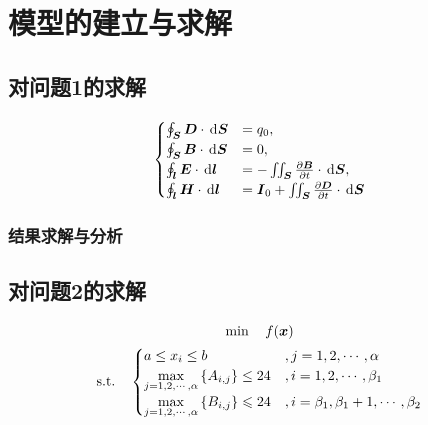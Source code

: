 
\section{模型的建立与求解}


\subsection{对问题1的求解}

\zhlipsum[1]

\begin{equation}\label{equ:麦克斯韦方程组}
\begin{cases}
\oint_{\boldsymbol{S}}\boldsymbol{D}\cdot\operatorname{\,\mathrm{d}\hspace{-1.5pt}}\boldsymbol{S} &= q_0, \\
\oint_{\boldsymbol{S}}\boldsymbol{B}\cdot\operatorname{\,\mathrm{d}\hspace{-1.5pt}}\boldsymbol{S} &= 0, \\
\oint_{\boldsymbol{l}}\boldsymbol{E}\cdot\operatorname{\,\mathrm{d}\hspace{-1.5pt}}\boldsymbol{l} &= -\iint_{\boldsymbol{S}}\frac{\partial \boldsymbol{B}}{\partial t}\cdot\operatorname{\,\mathrm{d}\hspace{-1.5pt}}\boldsymbol{S}, \\
\oint_{\boldsymbol{l}}\boldsymbol{H}\cdot\operatorname{\,\mathrm{d}\hspace{-1.5pt}}\boldsymbol{l} &= \boldsymbol{I}_0 + \iint_{\boldsymbol{S}}\frac{\partial \boldsymbol{D}}{\partial t}\cdot\operatorname{\,\mathrm{d}\hspace{-1.5pt}}\boldsymbol{S}
\end{cases}
\end{equation}

\zhlipsum[2]

\subsubsection{结果求解与分析}



\subsection{对问题2的求解}

\begin{gather}\label{equ:规划模型}
\min\quad{f(\boldsymbol{x})} \\
\text{s.t.}\quad\begin{cases}
    a \leq x_i\leq b &, j=1,2,\cdots ,\alpha \\
	\max\limits_{j=1,2,\cdots ,\alpha}{\{A_{i,j}\}} \leq 24 &, i=1,2,\cdots ,\beta_1\\
	\max\limits_{j=1,2,\cdots ,\alpha}{\{B_{i,j}\}} \leqslant 24 &, i=\beta_1, \beta_1+1,\cdots, \beta_2 \\
    \end{cases}
\end{gather}


